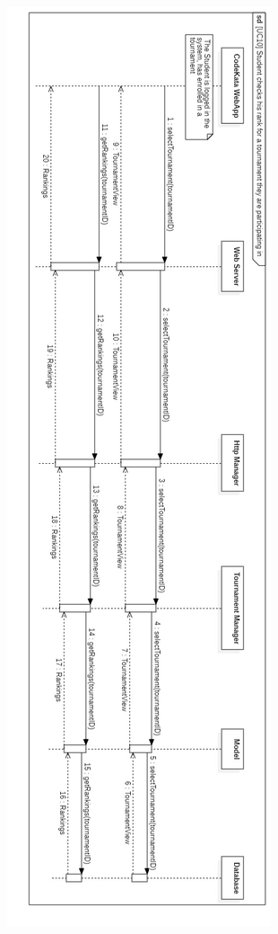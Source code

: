 \documentclass{article}
\begin{document}
\newpage
\begin{center}
    \includegraphics[angle=90,width=0.37\linewidth]{uc10.jpg}
  \label{fig:uc10}
\end{center}
\end{document}
